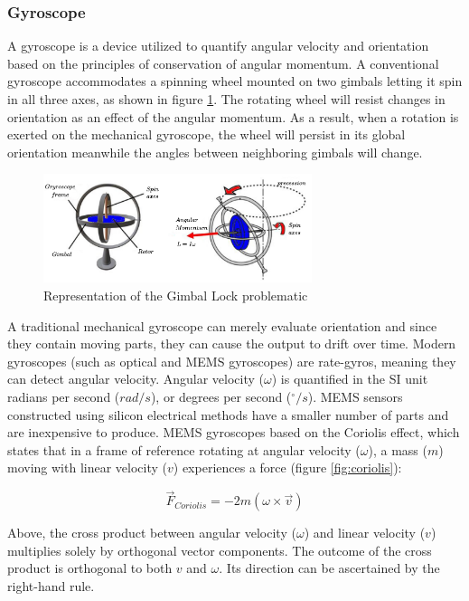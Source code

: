 \subsubsection{Gyroscope}
A gyroscope is a device utilized to quantify angular velocity and orientation based on the principles of conservation of angular momentum. A conventional gyroscope accommodates a spinning wheel mounted on two gimbals letting it spin in all three axes, as shown in figure \ref{fig:gyroscope}. The rotating wheel will resist changes in orientation as an effect of the angular momentum. As a result, when a rotation is exerted on the mechanical gyroscope, the wheel will persist in its global orientation meanwhile the angles between neighboring gimbals will change.

\begin{figure}[!h]
    \centering
    \includegraphics[width=0.7\textwidth]{figures/gyroscope.pdf}
    \caption{Representation of the Gimbal Lock problematic \cite{zeitlhofler2019nominal}  }
    \label{fig:gyroscope}
\end{figure}

A traditional mechanical gyroscope can merely evaluate orientation and since they contain moving parts, they can cause the output to drift over time. Modern gyroscopes (such as optical and MEMS gyroscopes) are rate-gyros, meaning they can detect angular velocity. Angular velocity ($\omega$) is quantified in the SI unit radians per second ($rad/s$), or degrees per second ($^{\circ}/s$). MEMS sensors constructed using silicon electrical methods have a smaller number of parts and are inexpensive to produce. MEMS gyroscopes based on the Coriolis effect, which states that in a frame of reference rotating at angular velocity ($\omega$), a mass ($m$) moving with linear velocity ($v$) experiences a force (figure \ref{fig:coriolis}):

\begin{equation}
    \overrightarrow{F}_{Coriolis} = -2m(\omega \times \overrightarrow{v} )
\end{equation}

Above, the cross product between angular velocity ($\omega$) and linear velocity ($v$) multiplies solely by orthogonal vector components. The outcome of the cross product is orthogonal to both $v$ and $\omega$. Its direction can be ascertained by the right-hand rule.

